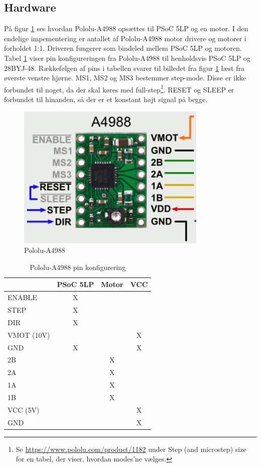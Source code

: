 \subsection{Hardware}
\label{HW_Implementering}
På figur \ref{fig:Pololu-A4988} ses hvordan Pololu-A4988 opsættes til PSoC 5LP og en motor. I den endelige impementering er antallet af Pololu-A4988 motor drivere og motorer i forholdet 1:1. Driveren fungerer som bindeled mellem PSoC 5LP og motoren. Tabel \ref{tab:Pololu-A4988_pin_configuration} viser pin konfigureringen fra Pololu-A4988 til henholdsvis PSoC 5LP og 28BYJ-48. Rækkefølgen af pins i tabellen svarer til billedet fra figur \ref{fig:Pololu-A4988} læst fra øverste venstre hjørne. MS1, MS2 og MS3 bestemmer step-mode. Disse er ikke forbundet til noget, da der skal køres med full-step\footnote{Se \url{https://www.pololu.com/product/1182} under Step (and microstep) size for en tabel, der viser, hvordan modes'ne vælges.}. RESET og SLEEP er forbundet til hinanden, så der er et konstant højt signal på begge.

\begin{figure}[H]
	\centerline{\includegraphics[scale=0.6]{tex/Implementering/Implementering_til_projektrapport/Pololu-A4988.png}}
	\caption{Pololu-A4988}
	\label{fig:Pololu-A4988}
\end{figure}

\begin{table}[H]
  \centering
\begin{tabular}{ |l|c|c|c| }
  \hline
   & \textbf{PSoC 5LP} & \textbf{Motor} & \textbf{VCC} \\
  \hline 
  ENABLE & X & & \\
  \hline
  STEP & X & & \\
  \hline
  DIR & X & & \\
  \hline
  VMOT (10V) & & & X \\
  \hline
  GND & X & & X \\
  \hline
  2B & & X & \\
  \hline
  2A & & X & \\
  \hline
  1A & & X & \\
  \hline
  1B & & X & \\
  \hline
  VCC (5V) & & & X \\
  \hline
  GND & & & X \\
  \hline
\end{tabular}
\caption{Pololu-A4988 pin konfigurering}\label{tab:Pololu-A4988_pin_configuration}
\end{table}

